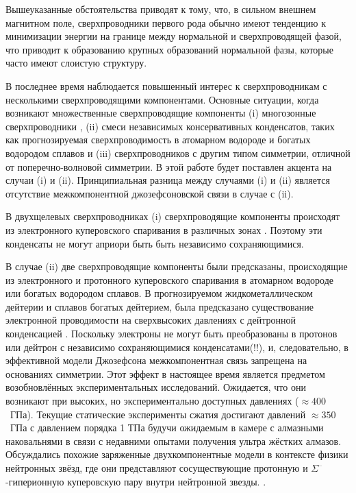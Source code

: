 Вышеуказанные обстоятельства приводят к тому, что, в сильном внешнем магнитном 
поле, сверхпроводники первого рода обычно имеют тенденцию к минимизации 
энергии на границе между нормальной и сверхпроводящей фазой, что приводит к 
образованию крупных образований нормальной фазы, которые часто имеют слоистую 
структуру\cite{bib:4}. 

В последнее время наблюдается повышенный интерес к сверхпроводникам с 
несколькими сверхпроводящими компонентами. Основные ситуации, когда возникают 
множественные сверхпроводящие компоненты (i) многозонные сверхпроводники
\cite{bib:6,bib:7,bib:8,bib:9,bib:10,bib:11}, (ii) смеси независимых 
консервативных конденсатов, таких как прогнозируемая сверхпроводимость в 
атомарном водороде и богатых водородом сплавов \cite{bib:12,bib:13,bib:14} и 
(iii) сверхпроводников с другим типом симметрии, отличной от 
поперечно-волновой симметрии. В этой работе будет поставлен акцента на случаи 
(i) и (ii). Принципиальная разница между случаями (i) и (ii) является 
отсутствие межкомпонентной джозефсоновской связи в случае с (ii).

В двухщелевых сверхпроводниках (i) сверхпроводящие компоненты происходят из
электронного куперовского спаривания в различных зонах \cite{bib:6}. Поэтому 
эти конденсаты не могут априори быть быть независимо сохраняющимися.

В случае (ii) две сверхпроводящие компоненты были предсказаны, происходящие 
из электронного и протонного куперовского спаривания в атомарном водороде 
или богатых водородом сплавов. В прогнозируемом жидкометаллическом дейтерии и 
сплавов богатых дейтерием, была предсказано существование электронной 
проводимости на сверхвысоких давлениях с дейтронной конденсацией  
\cite{bib:12,bib:13,bib:14}. Поскольку электроны не могут быть преобразованы в 
протонов или дейтрон с независимо сохраняющимися конденсатами(!!), и, 
следовательно, в эффективной модели Джозефсона межкомпонентная связь запрещена 
на основаниях симметрии. Этот эффект в настоящее время является предметом 
возобновлённых экспериментальных исследований. Ожидается, что они возникают 
при высоких, но экспериментально доступных давлениях (\( \approx 400 \)~ГПа). 
Текущие статические эксперименты сжатия достигают давлений 
\( \approx 350 \)~ГПа с давлением порядка 1 ТПа будучи ожидаемым в камере с 
алмазными наковальнями в связи с недавними опытами получения ультра жёстких 
алмазов. Обсуждались похожие заряженные двухкомпонентные модели в контексте 
физики нейтронных звёзд, где они представляют сосуществующие протонную и 
\( \Sigma^\text{--} \)-гиперионную куперовскую пару внутри нейтронной звезды.
\cite{bib:15}. 

